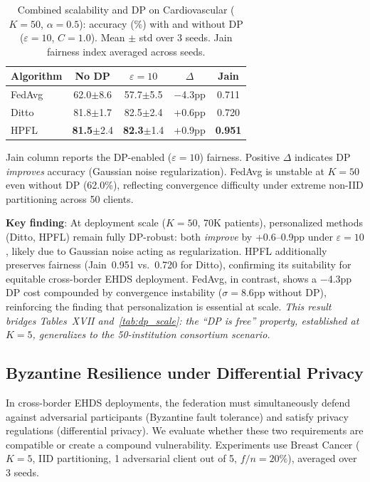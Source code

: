 \documentclass[conference]{IEEEtran}
\begin{document}
\begin{table}[htbp]
\centering
\caption{Combined scalability and DP on Cardiovascular ($K{=}50$, $\alpha{=}0.5$): accuracy (\%) with and without DP ($\varepsilon{=}10$, $C{=}1.0$). Mean $\pm$ std over 3 seeds. Jain fairness index averaged across seeds.}
\label{tab:dp_scale_cv}
\small
\begin{tabular}{lcccc}
\toprule
\textbf{Algorithm} & \textbf{No DP} & \textbf{$\varepsilon{=}10$} & \textbf{$\Delta$} & \textbf{Jain} \\
\midrule
FedAvg & 62.0{\tiny$\pm$8.6} & 57.7{\tiny$\pm$5.5} & $-$4.3pp & 0.711 \\
Ditto & 81.8{\tiny$\pm$1.7} & 82.5{\tiny$\pm$2.4} & +0.6pp & 0.720 \\
HPFL & \textbf{81.5}{\tiny$\pm$2.4} & \textbf{82.3}{\tiny$\pm$1.4} & +0.9pp & \textbf{0.951} \\
\bottomrule
\end{tabular}

\vspace{1mm}
\footnotesize{Jain column reports the DP-enabled ($\varepsilon{=}10$) fairness. Positive $\Delta$ indicates DP \textit{improves} accuracy (Gaussian noise regularization). FedAvg is unstable at $K{=}50$ even without DP (62.0\%), reflecting convergence difficulty under extreme non-IID partitioning across 50 clients.}
\end{table}

\textbf{Key finding}: At deployment scale ($K{=}50$, 70K patients), personalized methods (Ditto, HPFL) remain fully DP-robust: both \textit{improve} by +0.6--0.9pp under $\varepsilon{=}10$, likely due to Gaussian noise acting as regularization. HPFL additionally preserves fairness (Jain~0.951 vs.\ 0.720 for Ditto), confirming its suitability for equitable cross-border EHDS deployment. FedAvg, in contrast, shows a $-$4.3pp DP cost compounded by convergence instability ($\sigma{=}8.6$pp without DP), reinforcing the finding that personalization is essential at scale. \textit{This result bridges Tables~XVII and~\ref{tab:dp_scale}: the ``DP is free'' property, established at $K{=}5$, generalizes to the 50-institution consortium scenario.}

\subsection{Byzantine Resilience under Differential Privacy}\label{sec:byzantine_dp}

In cross-border EHDS deployments, the federation must simultaneously defend against adversarial participants (Byzantine fault tolerance) and satisfy privacy regulations (differential privacy). We evaluate whether these two requirements are compatible or create a compound vulnerability. Experiments use Breast Cancer ($K{=}5$, IID partitioning, 1 adversarial client out of 5, $f/n{=}20\%$), averaged over 3 seeds.
\end{document}
